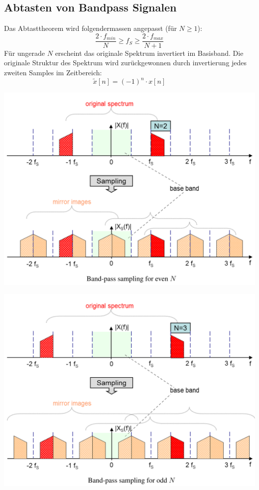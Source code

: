 \subsection{Abtasten von Bandpass Signalen}
Das Abtasttheorem wird folgendermassen angepasst (für $N\geq 1$):
\[ \frac{2\cdot f_{min}}{N} \geq f_S \geq \frac{2\cdot f_{max}}{N+1} \]
Für ungerade $N$ erscheint das originale Spektrum invertiert im Basisband.
Die originale Struktur des Spektrum wird zurückgewonnen durch invertierung
jedes zweiten Samples im Zeitbereich:
\[ \tilde{x}[n] = (-1)^n \cdot x[n] \]

\begin{minipage}{.5\textwidth}
	\begin{center}
		\includegraphics[width=\textwidth]{./images/bandpass_even}
	\end{center}
\end{minipage}
\begin{minipage}{.5\textwidth}
	\begin{center}
		\includegraphics[width=\textwidth]{./images/bandpass_odd}
	\end{center}
\end{minipage}

